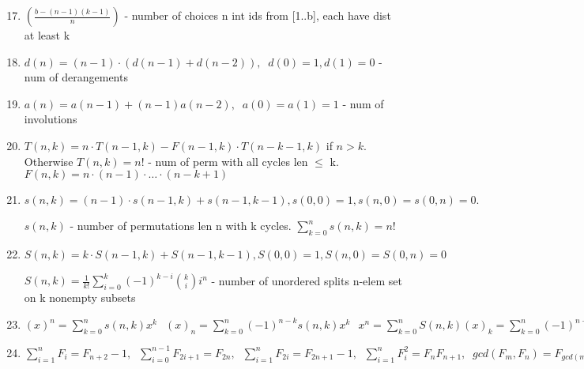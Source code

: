 \begin{large}
	\begin{enumerate}
		\setcounter{enumi}{16}
		\item $\left( \frac{b-(n-1)(k-1)}{n} \right)$ - number of choices n int ids from [1..b], each have dist at least k
		\item $d(n)=(n-1) \cdot (d(n-1)+d(n-2)),\;\; d(0)=1,d(1)=0$ - num of derangements
		\item $a(n)=a(n-1) + (n-1)a(n-2),\;\;a(0) = a(1) = 1$ - num of involutions
		\item $T(n, k)= n \cdot T(n-1, k) - F(n-1, k) \cdot T(n-k-1, k)$ if $n > k$. Otherwise $T(n,k)=n!$ - num of perm with all cycles len $\leq$ k. $F(n, k) = n \cdot (n - 1) \cdot … \cdot (n - k + 1)$
		\item $s(n,k)=(n-1) \cdot s(n-1,k)+s(n-1,k-1), s(0,0)=1,s(n,0)=s(0,n)=0.$ \par
		 $s(n,k)$ - number of permutations len n with k cycles. $\sum_{k=0}^{n}s(n,k) = n!$
		\item $S(n,k)=k \cdot S(n-1,k)+S(n-1,k-1), S(0,0)=1,S(n,0)=S(0,n)=0$ \par
		 $S(n,k) = \frac{1}{k!}\sum\limits_{i=0}^{k}(-1)^{k-i}{k \choose i}i^n$ - number of unordered splits n-elem set on k nonempty subsets
		\item $(x)^n = \sum\limits_{k=0}^{n}s(n,k)x^k\,\;\;
		(x)_n = \sum\limits_{k=0}^{n}(-1)^{n-k}s(n,k)x^k\,\;\;
		x^n = \sum\limits_{k=0}^{n}S(n,k)(x)_k = \sum\limits_{k=0}^{n}(-1)^{n-k}S(n,k)(x)^k$
		\item $\sum\limits_{i=1}^{n}F_i=F_{n+2}-1,\;\; \sum\limits_{i=0}^{n-1}F_{2i+1}=F_{2n},\;\; \sum\limits_{i=1}^{n}F_{2i}=F_{2n+1}-1,\;\;
		\sum\limits_{i=1}^{n}F_{i}^{2}=F_nF_{n+1},\;\;
		gcd(F_m, F_n)=F_{gcd(m, n)}$
	\end{enumerate}
\end{large}
